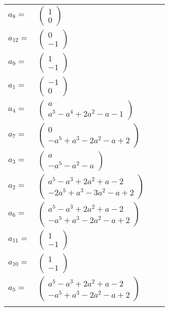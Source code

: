 \documentclass[1p]{elsarticle_modified}
\theoremstyle{definition}
\begin{document}
\begin{tabular}{m{7pt} m{180pt} m{7pt} m{180pt} }
\flushright $a_{8}=$&$\begin{pmatrix}1\\0\end{pmatrix}$ \\
\flushright $a_{12}=$&$\begin{pmatrix}0\\-1\end{pmatrix}$ \\
\flushright $a_{9}=$&$\begin{pmatrix}1\\-1\end{pmatrix}$ \\
\flushright $a_{1}=$&$\begin{pmatrix}-1\\0\end{pmatrix}$ \\
\flushright $a_{4}=$&$\begin{pmatrix}a\\a^5- a^4+2 a^2- a-1\end{pmatrix}$ \\
\flushright $a_{7}=$&$\begin{pmatrix}0\\- a^5+a^3-2 a^2- a+2\end{pmatrix}$ \\
\flushright $a_{3}=$&$\begin{pmatrix}a\\- a^5- a^2- a\end{pmatrix}$ \\
\flushright $a_{2}=$&$\begin{pmatrix}a^5- a^3+2 a^2+a-2\\-2 a^5+a^3-3 a^2- a+2\end{pmatrix}$ \\
\flushright $a_{6}=$&$\begin{pmatrix}a^5- a^3+2 a^2+a-2\\- a^5+a^3-2 a^2- a+2\end{pmatrix}$ \\
\flushright $a_{11}=$&$\begin{pmatrix}1\\-1\end{pmatrix}$ \\
\flushright $a_{10}=$&$\begin{pmatrix}1\\-1\end{pmatrix}$ \\
\flushright $a_{5}=$&$\begin{pmatrix}a^5- a^3+2 a^2+a-2\\- a^5+a^3-2 a^2- a+2\end{pmatrix}$\\&\end{tabular}
\end{document}
